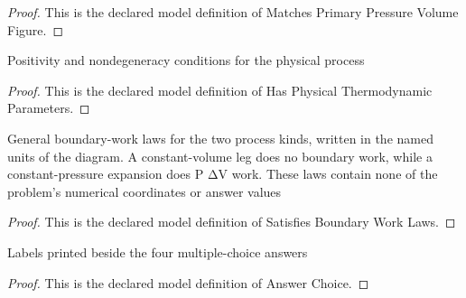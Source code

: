 \begin{proof}
  This is the declared model definition of Matches Primary Pressure Volume Figure.
\end{proof}
\begin{definition}
  \label{def:physics:phyx-mini-0492:phyxminiproblems-problemphyxmini0492-hasphysicalthermodynamicparameters}
  Positivity and nondegeneracy conditions for the physical process
\end{definition}
\begin{proof}
  This is the declared model definition of Has Physical Thermodynamic Parameters.
\end{proof}
\begin{definition}
  \label{def:physics:phyx-mini-0492:phyxminiproblems-problemphyxmini0492-satisfiesboundaryworklaws}
  General boundary-work laws for the two process kinds, written in the named units of the diagram. A constant-volume leg does no boundary work, while a constant-pressure expansion does P ΔV work. These laws contain none of the problem's numerical coordinates or answer values
\end{definition}
\begin{proof}
  This is the declared model definition of Satisfies Boundary Work Laws.
\end{proof}
\begin{definition}
  \label{def:physics:phyx-mini-0492:phyxminiproblems-problemphyxmini0492-answerchoice}
  Labels printed beside the four multiple-choice answers
\end{definition}
\begin{proof}
  This is the declared model definition of Answer Choice.
\end{proof}
